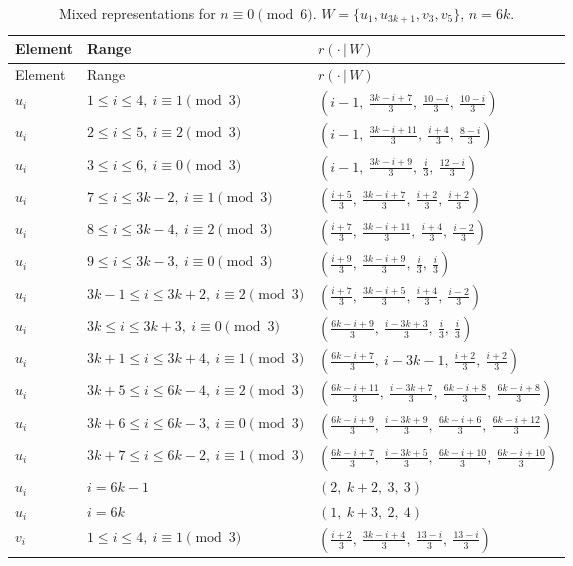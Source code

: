 \begin{longtable}{lll}
\caption{Mixed representations for $n\equiv 0 \pmod 6$. $W=\{u_{1}, u_{3k+1}, v_{3}, v_{5}\}$, $n=6k$.}\label{tab:W0}\\
\hline Element & Range & $r(\cdot\,|\,W)$ \\ \hline
\endfirsthead
\hline Element & Range & $r(\cdot\,|\,W)$ \\ \hline
\endhead
$u_i$ & $1 \le i \le 4,\ i \equiv 1 \pmod{3}$ & $(i-1,\ \frac{3k-i+7}{3},\ \frac{10-i}{3},\ \frac{10-i}{3})$ \\
$u_i$ & $2 \le i \le 5,\ i \equiv 2 \pmod{3}$ & $(i-1,\ \frac{3k-i+11}{3},\ \frac{i+4}{3},\ \frac{8-i}{3})$ \\
$u_i$ & $3 \le i \le 6,\ i \equiv 0 \pmod{3}$ & $(i-1,\ \frac{3k-i+9}{3},\ \frac{i}{3},\ \frac{12-i}{3})$ \\
$u_i$ & $7 \le i \le 3k-2,\ i \equiv 1 \pmod{3}$ & $(\frac{i+5}{3},\ \frac{3k-i+7}{3},\ \frac{i+2}{3},\ \frac{i+2}{3})$ \\
$u_i$ & $8 \le i \le 3k-4,\ i \equiv 2 \pmod{3}$ & $(\frac{i+7}{3},\ \frac{3k-i+11}{3},\ \frac{i+4}{3},\ \frac{i-2}{3})$ \\
$u_i$ & $9 \le i \le 3k-3,\ i \equiv 0 \pmod{3}$ & $(\frac{i+9}{3},\ \frac{3k-i+9}{3},\ \frac{i}{3},\ \frac{i}{3})$ \\
$u_i$ & $3k-1 \le i \le 3k+2,\ i \equiv 2 \pmod{3}$ & $(\frac{i+7}{3},\ \frac{3k-i+5}{3},\ \frac{i+4}{3},\ \frac{i-2}{3})$ \\
$u_i$ & $3k \le i \le 3k+3,\ i \equiv 0 \pmod{3}$ & $(\frac{6k-i+9}{3},\ \frac{i-3k+3}{3},\ \frac{i}{3},\ \frac{i}{3})$ \\
$u_i$ & $3k+1 \le i \le 3k+4,\ i \equiv 1 \pmod{3}$ & $(\frac{6k-i+7}{3},\ i-3k-1,\ \frac{i+2}{3},\ \frac{i+2}{3})$ \\
$u_i$ & $3k+5 \le i \le 6k-4,\ i \equiv 2 \pmod{3}$ & $(\frac{6k-i+11}{3},\ \frac{i-3k+7}{3},\ \frac{6k-i+8}{3},\ \frac{6k-i+8}{3})$ \\
$u_i$ & $3k+6 \le i \le 6k-3,\ i \equiv 0 \pmod{3}$ & $(\frac{6k-i+9}{3},\ \frac{i-3k+9}{3},\ \frac{6k-i+6}{3},\ \frac{6k-i+12}{3})$ \\
$u_i$ & $3k+7 \le i \le 6k-2,\ i \equiv 1 \pmod{3}$ & $(\frac{6k-i+7}{3},\ \frac{i-3k+5}{3},\ \frac{6k-i+10}{3},\ \frac{6k-i+10}{3})$ \\
$u_i$ & $i = 6k-1$ & $(2,\ k+2,\ 3,\ 3)$ \\
$u_i$ & $i = 6k$ & $(1,\ k+3,\ 2,\ 4)$ \\
$v_i$ & $1 \le i \le 4,\ i \equiv 1 \pmod{3}$ & $(\frac{i+2}{3},\ \frac{3k-i+4}{3},\ \frac{13-i}{3},\ \frac{13-i}{3})$ \\

\end{longtable}
